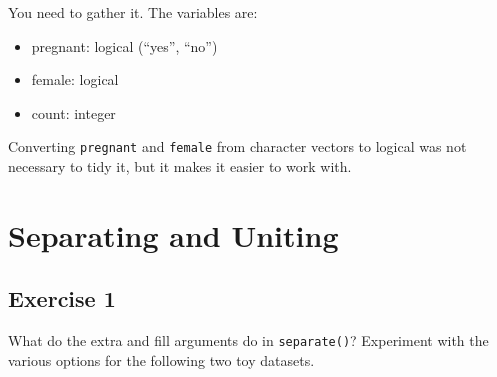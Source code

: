 \documentclass[]{book}
\newenvironment{Shaded}{\begin{snugshade}}{\end{snugshade}}
\newcommand{\CommentTok}[1]{\textcolor[rgb]{0.56,0.35,0.01}{\textit{#1}}}
\newcommand{\DataTypeTok}[1]{\textcolor[rgb]{0.13,0.29,0.53}{#1}}
\newcommand{\KeywordTok}[1]{\textcolor[rgb]{0.13,0.29,0.53}{\textbf{#1}}}
\newcommand{\NormalTok}[1]{#1}
\newcommand{\OperatorTok}[1]{\textcolor[rgb]{0.81,0.36,0.00}{\textbf{#1}}}
\newcommand{\StringTok}[1]{\textcolor[rgb]{0.31,0.60,0.02}{#1}}
\providecommand{\tightlist}{%
  \setlength{\itemsep}{0pt}\setlength{\parskip}{0pt}}
\theoremstyle{plain}
\theoremstyle{remark}
\theoremstyle{definition}
\theoremstyle{definition}
\theoremstyle{definition}
\theoremstyle{remark}
\begin{document}
You need to gather it. The variables are:

\begin{itemize}
\tightlist
\item
  pregnant: logical (``yes'', ``no'')
\item
  female: logical
\item
  count: integer
\end{itemize}

\begin{Shaded}
\end{Shaded}

Converting \texttt{pregnant} and \texttt{female} from character vectors
to logical was not necessary to tidy it, but it makes it easier to work
with.

\hypertarget{separating-and-uniting}{%
\section{Separating and Uniting}\label{separating-and-uniting}}

\hypertarget{exercise-1-23}{%
\subsection{Exercise 1}\label{exercise-1-23}}

What do the extra and fill arguments do in \texttt{separate()}?
Experiment with the various options for the following two toy datasets.
\end{document}
